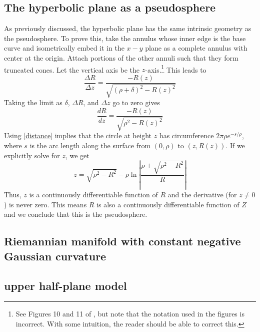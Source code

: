 \documentclass[letterpaper,titlepage]{article}
\begin{document}
\subsection{The hyperbolic plane as a pseudosphere}
As previously discussed, the hyperbolic plane has the same intrinsic geometry as the pseudosphere.
To prove this, take the annulus whose inner edge is the base curve and isometrically embed it in the $x-y$ plane as a complete annulus with center at the origin.
Attach portions of the other annuli such that they form truncated cones.
Let the vertical axis be the $z$-axis.\footnote{See Figures 10 and 11 of \cite{crochetplane}, but note that the notation used in the figures is incorrect. With some intuition, the reader should be able to correct this.}
This leads to
\begin{equation}
\frac{\Delta R}{\Delta z} = \frac{-R(z)}{\sqrt{ \left(\rho+\delta\right)^2 - R(z)^2 }}
\end{equation}
Taking the limit as $\delta$, $\Delta R$, and $\Delta z$ go to zero gives
\begin{equation}
\frac{dR}{dz} = \frac{-R(z)}{\sqrt{\rho^2 - R(z)^2}}
\label{drdz}
\end{equation}
Using \eqref{distance} implies that the circle at height $z$ has circumference $2\pi \rho e^{-s/\rho}$, where $s$ is the arc length along the surface from $(0,\rho)$ to $(z,R(z))$.
If we explicitly solve for $z$, we get
\begin{equation}
z = \sqrt{\rho^2 - R^2} - \rho \ln \left| \frac{\rho + \sqrt{\rho^2 - R^2}}{R} \right|
\end{equation}
Thus, $z$ is a continuously differentiable function of $R$ and the derivative (for $z \not= 0$) is never zero.
This means $R$ is also a continuously differentiable function of $Z$ and we conclude that this is the pseudosphere.

\subsection{Riemannian manifold with constant negative Gaussian curvature}
\subsection{upper half-plane model}
\end{document}
